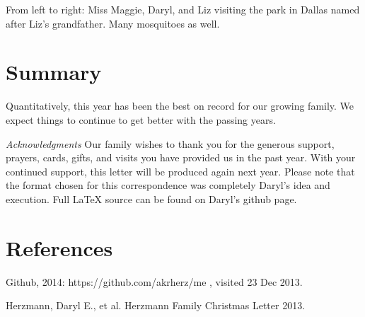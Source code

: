\documentclass{article}
\makeatletter
\def\refer{\par\noindent\hangindent\parindent\hangafter1}
\newenvironment{figurehere}
  {\def\@captype{figure}}
  {}
\makeatother
\begin{document}
\begin{multicols}{2}
\begin{figurehere}
 \centering   
 \caption{From left to right: Miss Maggie, Daryl, and Liz visiting the park
in Dallas named after Liz's grandfather. Many mosquitoes as well.}
\end{figurehere}

\section{Summary}

Quantitatively, this year has been the best on record for our growing 
family.  We expect
things to continue to get better with the passing years.

\bigskip
  \emph{Acknowledgments} Our family wishes to thank you for the generous 
support, prayers, cards, gifts, and visits you have provided us in the past
year. With your continued support, this letter will be produced again
next year. Please note that the format chosen for this correspondence was
completely Daryl's idea and execution. Full \LaTeX\xspace source can be found on 
Daryl's github page.

\section{References}

\refer Github, 2014: https://github.com/akrherz/me , visited 23 Dec 2013.
\refer Herzmann, Daryl E., et al. Herzmann Family Christmas Letter 2013. 

\end{multicols}
\end{document}
